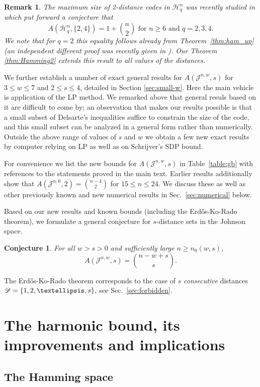 \documentclass{amsart}
\newtheorem{conjectureenv}[definitionenv]{Conjecture}
\newtheorem{remarkenv}[definitionenv]{Remark}
\newenvironment{remark}{\begin{remarkenv}\rm}{\end{remarkenv}}
\newenvironment{conjecture}{\begin{conjectureenv}\rm}{\end{conjectureenv}}
\newcommand{\cH}{\mathcal{H}}
\newcommand{\cJ}{\mathcal{J}}
\begin{document}
{\begin{remark} The maximum size of 2-distance codes in $\cH_q^n$ was recently studied in \cite{BDZZ21} which put forward a conjecture that 
   $$
A(\cH^{n}_{q}, \{2, 4\})=1+\binom n2 \text{ for } n \geq 6 \text{ and } q = 2, 3, 4.
   $$
We note that for $q=2$ this equality follows already from Theorem~\ref{thm:ham_up}
(an independent different proof was recently given in \cite{LR21}).
Our Theorem \ref{thm:Hamming2} extends this result to all values of the distances.
\end{remark}}

We further establish a number of exact general results for $A(\cJ^{n,w},s)$ for $3\le w\le 7$ and $2\le s\le 4$, detailed in Section \ref{sec:small-w}. Here the main vehicle is application of the LP method. We remarked above that general resuls based on it are difficult to come by; an observation
that makes our results possible is that a small subset of Delsarte's inequalities suffice to constrain the
size of the code, and this small subset can be analyzed in a general form rather than numerically. Outside the above range of values
of $s$ and $w$ we obtain a few new exact results by computer relying on LP as well as on Schrijver's SDP bound.

For convenience we list the new bounds for $A(\cJ^{n,w},s)$ in Table~\ref{table:gb} with references to the statements proved in the main text. {Earlier results \cite{MN11} additionally show that $A(\cJ^{n,6},2)=\binom{n-4}2$ for $15\le n\le 24.$  
We discuss these as well as other previously known and new numerical results in Sec.~\ref{sec:numerical} below.}

Based on our new results and known bounds (including the Erd\H{o}s-Ko-Rado theorem), we formulate a general conjecture for $s$-distance sets in the Johnson space.

\begin{conjecture}\label{conj:Johnson_general}
For all $w>s>0$ and sufficiently large $n\geq n_0(w,s)$, $$A(\cJ^{n,w},s)=\binom{n-w+s}s.$$
\end{conjecture}
The Erd\H{o}s-Ko-Rado theorem corresponds to the case of $s$ {\em consecutive} distances
$\sD=\{1,2,\dots,s\},$ see Sec.~\ref{sec:forbidden}.



\section{The harmonic bound, its improvements and implications}
\subsection{The Hamming space}
\end{document}

